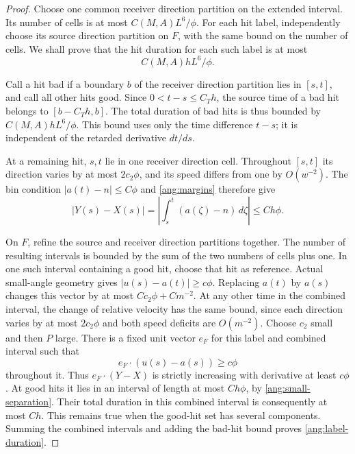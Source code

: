 \begin{proof}
Choose one common receiver direction partition on the extended
interval. Its number of cells is at most $C(M,A)L^6/\phi$.
For each hit label, independently choose its source direction
partition on $F$, with the same bound on the number of cells.
We shall prove that the hit duration for each such label is at most
\begin{equation}\label{ang:label-duration}
 C(M,A)hL^6/\phi.
\end{equation}

Call a hit bad if a boundary $b$ of the receiver direction partition
lies in $[s,t]$, and call all other hits good.
Since $0<t-s\le C_T h$, the source time of a bad hit belongs
to $[b-C_T h,b]$. The total duration of bad hits is thus bounded by
$C(M,A)hL^6/\phi$. This bound uses only the time difference $t-s$;
it is independent of the retarded derivative $dt/ds$.

At a remaining hit, $s,t$ lie in one receiver direction cell.
Throughout $[s,t]$ its direction varies by at most $2c_2\phi$,
and its speed differs from one by $O(w^{-2})$. The bin condition
$|a(t)-n|\le C\phi$ and \eqref{ang:margins} therefore give
\begin{equation}\label{ang:small-separation}
 |Y(s)-X(s)|
 =\left|\int_s^t(a(\zeta)-n)\,d\zeta\right|
 \le Ch\phi.
\end{equation}

On $F$, refine the source and receiver direction partitions together.
The number of resulting intervals is bounded by the sum of the two
numbers of cells plus one. In one such interval containing a good
hit, choose that hit as reference. Actual small-angle geometry gives
$|u(s)-a(t)|\ge c\phi$. Replacing $a(t)$ by $a(s)$ changes this vector
by at most $Cc_2\phi+Cm^{-2}$. At any other time in the combined
interval, the change of relative velocity has the same bound, since
each direction varies by at most $2c_2\phi$ and both speed deficits
are $O(m^{-2})$. Choose $c_2$ small and then $P$ large. There is a
fixed unit vector $e_F$ for this label and combined interval such that
\[
 e_F\cdot(u(s)-a(s))\ge c\phi
\]
throughout it. Thus $e_F\cdot(Y-X)$ is strictly increasing with
derivative at least $c\phi$. At good hits it lies in an interval of
length at most $Ch\phi$, by \eqref{ang:small-separation}. Their total
duration in this combined interval is consequently at most $Ch$.
This remains true when the good-hit set has several components.
Summing the combined intervals and adding the bad-hit bound proves
\eqref{ang:label-duration}.


\end{proof}
